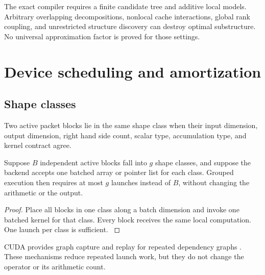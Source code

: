 \begin{remark}\label{main:remark:004}\label{rem:compiler_boundary}
The exact compiler requires a finite candidate tree and additive local models. Arbitrary overlapping decompositions, nonlocal cache interactions, global rank coupling, and unrestricted structure discovery can destroy optimal substructure. No universal approximation factor is proved for those settings.
\end{remark}

\section{Device scheduling and amortization}\label{main:section:010}\label{sec:scheduling}

\subsection{Shape classes}\label{main:subsection:016}

\begin{definition}\label{main:definition:014}\label{def:shape_class}
Two active packet blocks lie in the same shape class when their input dimension, output dimension, right hand side count, scalar type, accumulation type, and kernel contract agree.
\end{definition}

\begin{proposition}\label{main:proposition:010}\label{prop:shape_launch}
Suppose \(B\) independent active blocks fall into \(g\) shape classes, and suppose the backend accepts one batched array or pointer list for each class. Grouped execution then requires at most \(g\) launches instead of \(B\), without changing the arithmetic or the output.
\end{proposition}

\begin{proof}\label{main:proof:051}
Place all blocks in one class along a batch dimension and invoke one batched kernel for that class. Every block receives the same local computation. One launch per class is sufficient.
\label{main:proof:051:end}\end{proof}

CUDA provides graph capture and replay for repeated dependency graphs \cite{NVIDIA2026}. These mechanisms reduce repeated launch work, but they do not change the operator or its arithmetic count.

